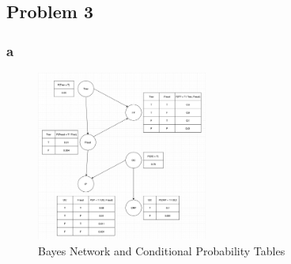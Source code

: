 \documentclass{article}
\begin{document}
\subsection*{Problem 3}

\subsubsection*{a}
\begin{figure}[!htbp]
\centering
\includegraphics[width=0.5\textwidth, height=0.5\textheight,keepaspectratio]{Network_and_Probabilities}
\caption{Bayes Network and Conditional Probability Tables}
\end{figure}
\end{document}
